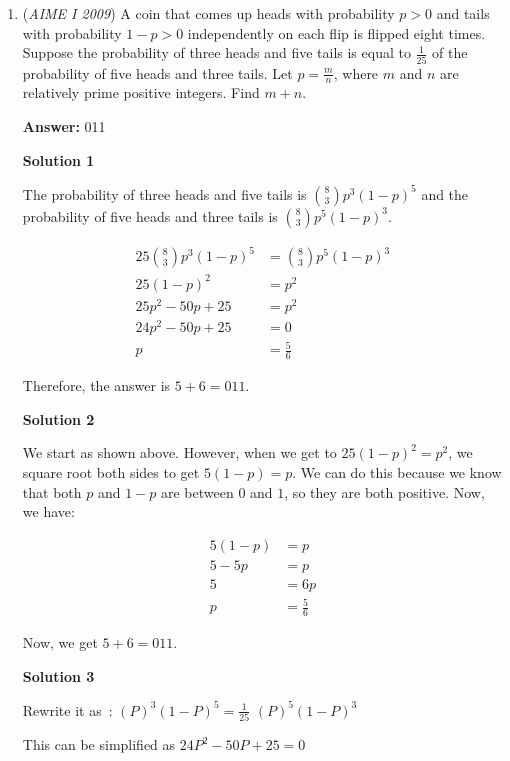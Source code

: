 \begin{enumerate}
 


	\item (\textit{AIME I 2009}) A coin that comes up heads with probability $p > 0$ and tails with probability $1 - p > 0$ independently on each flip is flipped eight times. Suppose the probability of three heads and five tails is equal to $\frac {1}{25}$ of the probability of five heads and three tails. Let $p = \frac {m}{n}$, where $m$ and $n$ are relatively prime positive integers. Find $m + n$.


 
 \textbf{Answer: }011



\textbf{Solution 1}

The probability of three heads and five tails is $\binom {8}{3}p^3(1-p)^5$ and the probability of five heads and three tails is $\binom {8}{3}p^5(1-p)^3$.

 
 \begin{align*} 25\binom {8}{3}p^3(1-p)^5&=\binom {8}{3}p^5(1-p)^3 \\ 25(1-p)^2&=p^2 \\ 25p^2-50p+25&=p^2 \\ 24p^2-50p+25&=0 \\ p&=\frac {5}{6}\end{align*}


 Therefore, the answer is $5+6=\boxed{011}$.

 



\textbf{Solution 2}

We start as shown above. However, when we get to $25(1-p)^2=p^2$, we square root both sides to get $5(1-p)=p$. We can do this because we know that both $p$ and $1-p$ are between $0$ and $1$, so they are both positive. Now, we have: 

 
 \begin{align*} 5(1-p)&=p \\ 5-5p&=p \\ 5&=6p \\ p&=\frac {5}{6}\end{align*}


 Now, we get $5+6=\boxed{011}$.

 



\textbf{Solution 3}

Rewrite it as : $(P)^3$$(1-P)^5=\frac {1}{25}$ $(P)^5$$(1-P)^3$

 This can be simplified as $24P^2 -50P + 25 = 0$


\end{enumerate}
